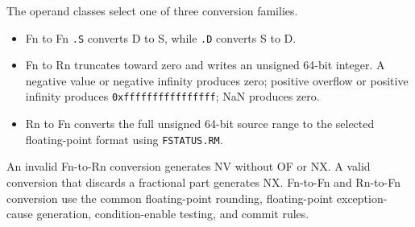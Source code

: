 The operand classes select one of three conversion families.

\begin{itemize}
\item Fn to Fn \texttt{.S} converts D to S, while \texttt{.D} converts S to D.
\item Fn to Rn truncates toward zero and writes an unsigned 64-bit integer. A negative value or negative infinity
produces zero; positive overflow or positive infinity produces \texttt{0xffffffffffffffff}; NaN produces zero.
\item Rn to Fn converts the full unsigned 64-bit source range to the selected floating-point format using
\texttt{FSTATUS.RM}.
\end{itemize}
An invalid Fn-to-Rn conversion generates NV without OF or NX. A valid conversion that discards a fractional part
generates NX. Fn-to-Fn and Rn-to-Fn conversion use the common floating-point rounding, floating-point
exception-cause generation, condition-enable testing, and commit rules.
